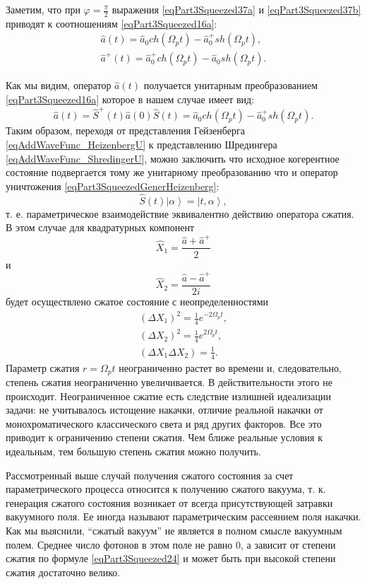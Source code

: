 Заметим, что при $\varphi = \frac{\pi}{2}$ выражения
\eqref{eqPart3Squeezed37a} и \eqref{eqPart3Squeezed37b} приводят к
соотношениям
\eqref{eqPart3Squeezed16a}:
\begin{eqnarray}
\hat{a}\left(t\right) = \hat{a}_0 ch \left(\Omega_p t \right) - 
\hat{a}^{+}_0 sh \left(\Omega_p t\right),
\nonumber \\
\hat{a}^{+}\left(t\right) = \hat{a}^{+}_0 ch \left(\Omega_p t \right) -
\hat{a}_0 sh \left(\Omega_p t\right).
\nonumber
\end{eqnarray}

Как мы видим, оператор $\hat{a}\left(t\right)$ получается унитарным
преобразованием \eqref{eqPart3Squeezed16a} которое в нашем случае
имеет вид:
\begin{equation}
\hat{a}\left(t\right) =
\hat{S}^{+}\left(t\right)
\hat{a}\left(0\right)
\hat{S}\left(t\right) =
\hat{a}_0 ch \left(\Omega_p t \right) - 
\hat{a}^{+}_0 sh \left(\Omega_p t\right).
\label{eqPart3SqueezedGenerHeizenberg}
\end{equation}
Таким образом, переходя от представления Гейзенберга
\eqref{eqAddWaveFunc_HeizenbergU}
к представлению Шредингера \eqref{eqAddWaveFunc_ShredingerU}, можно
заключить что исходное когерентное состояние подвергается тому же
унитарному преобразованию что и оператор уничтожения
\eqref{eqPart3SqueezedGenerHeizenberg}:
\begin{equation}
\hat{S}\left(t\right)
\left|\alpha\right> =
\left|t, \alpha\right>,
\nonumber
\end{equation}
т. е. параметрическое взаимодействие эквивалентно действию оператора
сжатия. В этом случае для
квадратурных компонент 
\[
\hat{X}_1 = \frac{\hat{a} + \hat{a}^{+}}{2}
\]
и
\[
\hat{X}_2 = \frac{\hat{a} - \hat{a}^{+}}{2i}
\]
будет осуществлено сжатое состояние с неопределенностями 
\begin{eqnarray}
\left(\Delta X_1\right)^2 = 
\frac{1}{4}e^{-2 \Omega_p t},
\nonumber \\
\left(\Delta X_2\right)^2 = 
\frac{1}{4}e^{2 \Omega_p t},
\nonumber \\
\left(\Delta X_1 \Delta X_2\right) = 
\frac{1}{4}.
\nonumber
\end{eqnarray}
Параметр сжатия $r = \Omega_p t$ неограниченно растет во времени и,
следовательно, степень сжатия неограниченно увеличивается. В
действительности этого не происходит. Неограниченное сжатие есть
следствие излишней идеализации задачи: не учитывалось истощение
накачки, отличие реальной накачки от монохроматического классического
света и ряд других факторов. Все это приводит к ограничению степени
сжатия. Чем ближе реальные условия к идеальным, тем большую степень
сжатия можно получить. 

Рассмотренный выше случай получения сжатого состояния за счет
параметрического процесса относится к получению сжатого вакуума,
т. к. генерация сжатого состояния возникает от всегда присутствующей
затравки вакуумного поля. Ее иногда называют параметрическим
рассеянием поля накачки. Как мы выяснили, ``сжатый вакуум'' не является
в полном смысле вакуумным полем. Среднее число фотонов в этом поле не
равно 0, а зависит от степени сжатия по формуле
\eqref{eqPart3Squeezed24} и может быть при 
высокой степени сжатия достаточно велико.

